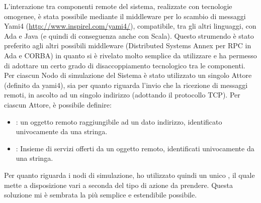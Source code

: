 L'interazione tra componenti remote del sistema, realizzate con tecnologie omogenee, è stata possibile mediante il middleware per lo scambio di messaggi Yami4 (\url{http://www.inspirel.com/yami4/}), compatibile, tra gli altri linguaggi, con Ada e Java (e quindi di conseguenza anche con Scala). Questo strumendo è stato preferito agli altri possibili middleware (Distributed Systems Annex per RPC in Ada e CORBA) in quanto si è rivelato molto semplice da utilizzare e ha permesso di adottare un certo grado di disaccoppiamento tecnologico tra le componenti. Per ciascun Nodo di simulazione del Sistema è stato utilizzato un singolo Attore (definito da yami4), sia per quanto riguarda l'invio che la ricezione di messaggi remoti, in ascolto ad un singolo indirizzo (adottando il protocollo TCP). Per ciascun Attore, è possibile definire:
	\begin{itemize}
		\item {}: un oggetto remoto raggiungibile ad un dato indirizzo, identificato univocamente da una stringa.
		\item {}: Insieme di servizi offerti da un oggetto remoto, identificati univocamente da una stringa.
	\end{itemize}
Per quanto riguarda i nodi di simulazione, ho utilizzato quindi un unico , il quale mette a disposizione vari  a seconda del tipo di azione da prendere. Questa soluzione mi è sembrata la più semplice e estendibile possibile.



